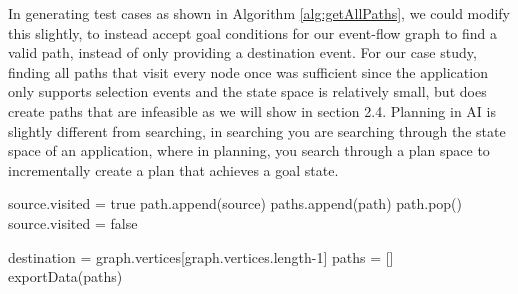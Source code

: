 \documentclass[final,3p]{CSP}
\begin{document}
In generating test cases as shown in Algorithm \ref{alg:getAllPaths}, we could modify this slightly, to instead accept goal conditions for our event-flow graph to find a valid path, instead of only providing a destination event.  For our case study, finding all paths that visit every node once was sufficient since the application only supports selection events and the state space is relatively small, but does create paths that are infeasible as we will show in section 2.4.  Planning in AI is slightly different from searching, in searching you are searching through the state space of an application, where in planning, you search through a plan space to incrementally create a plan that achieves a goal state.

 
\begin{algorithm}
     {
      source.visited = true\;
      path.append(source)\;
      {
        paths.append(path)\;
      }
      {
      }
      path.pop()\;
      source.visited = false\;
    }
    \caption{Simple path finding Algorithm that finds all paths between a source event and a destination event in an event-flow graph}
    \label{alg:getAllPaths}
\end{algorithm}

\begin{algorithm}
     {
        destination = graph.vertices[graph.vertices.length-1]\;
        paths = []\;
        exportData(paths)\;
    }
    \caption{Algorithm that loops through the top-level virtual objects and uses getAllPaths to generate the tests}
    \label{alg:generatetests}
\end{algorithm}
\end{document}
